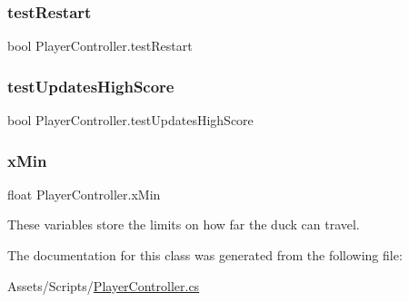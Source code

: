 \subsubsection{\texorpdfstring{testRestart}{testRestart}}
{\footnotesize\ttfamily bool Player\+Controller.\+test\+Restart}

\mbox{\label{class_player_controller_aa95666d7ebdc47342a0fe58a8c58d846}} 
\subsubsection{\texorpdfstring{testUpdatesHighScore}{testUpdatesHighScore}}
{\footnotesize\ttfamily bool Player\+Controller.\+test\+Updates\+High\+Score}

\mbox{\label{class_player_controller_a373cbc1dfe44cb185a84422b4a56bf9b}} 
\subsubsection{\texorpdfstring{xMin}{xMin}}
{\footnotesize\ttfamily float Player\+Controller.\+x\+Min}



These variables store the limits on how far the duck can travel. 



The documentation for this class was generated from the following file\+:\begin{DoxyCompactItemize}
\item 
Assets/\+Scripts/\mbox{\hyperlink{_player_controller_8cs}{Player\+Controller.\+cs}}\end{DoxyCompactItemize}
